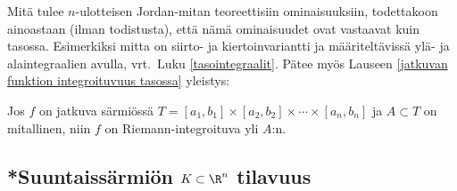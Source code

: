 Mitä tulee $n$-ulotteisen Jordan-mitan teoreettisiin ominaisuuksiin, todettakoon ainoastaan
(ilman todistusta), että nämä ominaisuudet ovat vastaavat kuin tasossa. Esimerkiksi mitta on
siirto- ja kiertoinvariantti ja määriteltävissä ylä- ja alaintegraalien avulla, vrt.\ Luku
\ref{tasointegraalit}. Pätee myös Lauseen \ref{jatkuvan funktion integroituvuus tasossa}
yleistys:
\begin{*Lause} \label{jatkuvan funktion integroituvuus Rn:ssä}
 Jos $f$ on jatkuva särmiössä
$T=[a_1,b_1] \times [a_2,b_2] \times \cdots \times [a_n,b_n]$ ja $A \subset T$ on mitallinen,
niin $f$ on Riemann-integroituva yli $A$:n.
\end{*Lause} 

\subsection*{*Suuntaissärmiön $K\subset\R^n$ tilavuus}

